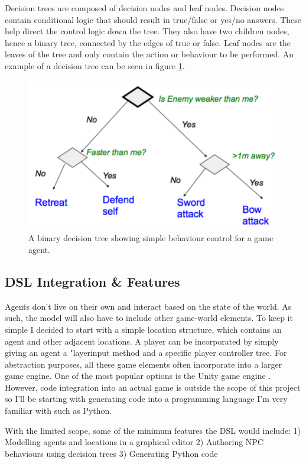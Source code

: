\documentclass[letterpaper,12pt]{article}  %
\begin{document}
Decision trees are composed of decision nodes and leaf nodes. Decision nodes contain conditional logic that should result in true/false or yes/no answers. These help direct the control logic down the tree. They also have two children nodes, hence a binary tree, connected by the edges of true or false. Leaf nodes are the leaves of the tree and only contain the action or behaviour to be performed. An example of a decision tree can be seen in figure \ref{fig:decisiontree}.

\begin{figure}[h]  %
    \centering  %
    \includegraphics[width = 8 cm ]{DecisionTree.png}
    \caption{A binary decision tree showing simple behaviour control for a game agent.}
    \label{fig:decisiontree}
\end{figure}

\subsection{DSL Integration & Features}
Agents don’t live on their own and interact based on the state of the world. As such, the model will also have to include other game-world elements. To keep it simple I decided to start with a simple location structure, which contains an agent and other adjacent locations. A player can be incorporated by simply giving an agent a "layerinput method and a specific player controller tree. For abstraction purposes, all these game elements often incorporate into a larger game engine. One of the most popular options is the Unity game engine \cite{technologies_unity_nodate}. However, code integration into an actual game is outside the scope of this project so I’ll be starting with generating code into a programming language I’m very familiar with such as Python.

With the limited scope, some of the minimum features the DSL would include:
1)	 Modelling agents and locations in a graphical editor
2)	Authoring NPC behaviours using decision trees
3)	Generating Python code
\end{document}
